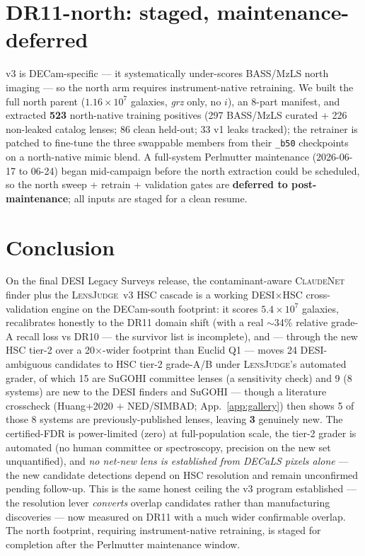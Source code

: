 \documentclass[11pt,letterpaper]{article}
\newcommand{\cnet}{\textsc{ClaudeNet}}
\newcommand{\lj}{\textsc{LensJudge}}
\begin{document}


\section{DR11-north: staged, maintenance-deferred}
\label{sec:north}
v3 is DECam-specific --- it systematically under-scores BASS/MzLS north imaging --- so the north arm
requires instrument-native retraining. We built the full north parent (\textbf{$1.16\times10^{7}$}
galaxies, \emph{grz} only, no $i$), an 8-part manifest, and extracted \textbf{523} north-native
training positives (297 BASS/MzLS curated + 226 non-leaked catalog lenses; 86 clean held-out; 33 v1
leaks tracked); the retrainer is patched to fine-tune the three swappable members from their \texttt{\_b50}
checkpoints on a north-native mimic blend. A full-system Perlmutter maintenance (2026-06-17 to 06-24)
began mid-campaign before the north extraction could be scheduled, so the north sweep + retrain +
validation gates are \textbf{deferred to post-maintenance}; all inputs are staged for a clean resume.

\section{Conclusion}
On the final DESI Legacy Surveys release, the contaminant-aware \cnet{} finder plus the \lj{}~v3 HSC
cascade is a working DESI$\times$HSC cross-validation engine on the DECam-south footprint: it scores
$5.4\times10^{7}$ galaxies, recalibrates honestly to the DR11 domain shift (with a real $\sim$34\%
relative grade-A recall loss vs DR10 --- the survivor list is incomplete), and --- through the new
HSC tier-2 over a 20$\times$-wider footprint than Euclid Q1 --- moves 24 DESI-ambiguous candidates to
HSC tier-2 grade-A/B under \lj{}'s automated grader, of which 15 are SuGOHI committee lenses (a
sensitivity check) and 9 (8 systems) are new to the DESI finders and SuGOHI --- though a literature
crosscheck (Huang+2020 $+$ NED/SIMBAD; App.~\ref{app:gallery}) then shows 5 of those 8 systems are
previously-published lenses, leaving \textbf{3} genuinely new. The certified-FDR is power-limited
(zero) at full-population scale, the tier-2 grader is automated (no human committee or spectroscopy,
precision on the new set unquantified), and \emph{no net-new lens is established from DECaLS pixels
alone} --- the new candidate detections depend on HSC resolution and remain unconfirmed pending
follow-up. This is the same honest ceiling the v3 program established --- the resolution lever
\emph{converts} overlap candidates rather than manufacturing discoveries --- now measured on DR11 with a
much wider confirmable overlap. The north footprint, requiring instrument-native retraining, is staged
for completion after the Perlmutter maintenance window.
\end{document}
